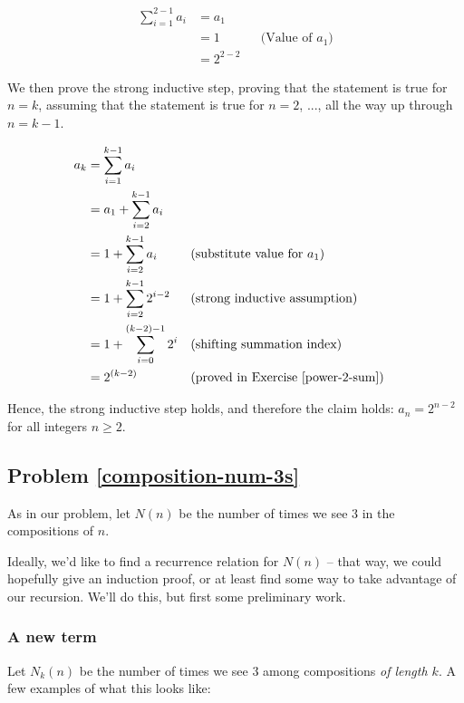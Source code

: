 \begin{align*}
\sum_{i=1}^{2-1} a_i &= a_1 \\
&= 1 && \text{(Value of $a_1$)} \\
&= 2^{2-2}
\end{align*}

We then prove the strong inductive step, proving that the statement is true for $n = k$, assuming that the statement is true for $n = 2$, ..., all the way up through $n = k - 1$.

\begin{align*}
a_k &= \sum_{i=1}^{k-1} a_i \\
&= a_1 + \sum_{i=2}^{k-1} a_i \\
&= 1 + \sum_{i=2}^{k-1} a_i && \text{(substitute value for $a_1$)} \\
&= 1 + \sum_{i=2}^{k-1} 2^{i-2} && \text{(strong inductive assumption)} \\
&= 1 + \sum_{i=0}^{(k-2)-1} 2^i && \text{(shifting summation index)} \\
&= 2^{(k-2)} && \text{(proved in Exercise \ref{power-2-sum})}
\end{align*}

Hence, the strong inductive step holds, and therefore the claim holds: $a_n = 2^{n-2}$ for all integers $n \geq 2$. 


\subsection{Problem \ref{composition-num-3s}}

As in our problem, let $N(n)$ be the number of times we see 3 in the compositions of $n$. 

Ideally, we'd like to find a recurrence relation for $N(n)$ -- that way, we could hopefully give an induction proof, or at least find some way to take advantage of our recursion. We'll do this, but first some preliminary work.

\subsubsection{A new term}

Let $N_k(n)$ be the number of times we see 3 among compositions \emph{of length $k$}. A few examples of what this looks like:

